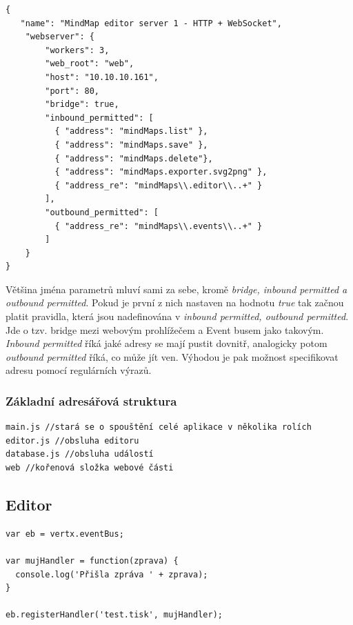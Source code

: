 \begin{lstlisting}[caption=Konfigurace serveru 1]
{
   "name": "MindMap editor server 1 - HTTP + WebSocket",
    "webserver": {
        "workers": 3,
        "web_root": "web",
        "host": "10.10.10.161",
        "port": 80,
        "bridge": true,
        "inbound_permitted": [
          { "address": "mindMaps.list" },
          { "address": "mindMaps.save" },
          { "address": "mindMaps.delete"},
          { "address": "mindMaps.exporter.svg2png" },
          { "address_re": "mindMaps\\.editor\\..+" }
        ],
        "outbound_permitted": [
          { "address_re": "mindMaps\\.events\\..+" }
        ]
    }
}
\end{lstlisting}

Většina jména parametrů mluví sami za sebe, kromě \emph{bridge, inbound permitted a outbound permitted}. Pokud je první z nich nastaven na hodnotu \emph{true} tak začnou platit pravidla, která jsou nadefinována v \emph{inbound permitted, outbound permitted}. Jde o tzv. bridge mezi webovým prohlížečem a Event busem jako takovým. \emph{Inbound permitted} říká jaké adresy se mají pustit dovnitř, analogicky potom \emph{outbound permitted} říká, co může jít ven. Výhodou je pak možnost specifikovat adresu pomocí regulárních výrazů.

\subsubsection{Základní adresářová struktura}

\begin{lstlisting}
main.js //stará se o spouštění celé aplikace v několika rolích
editor.js //obsluha editoru
database.js //obsluha událostí 
web //kořenová složka webové části
\end{lstlisting}

\subsection{Editor}

\begin{lstlisting}[caption=Zaregistrování obslužné rutiny v jazyce JavaScript]
var eb = vertx.eventBus;

var mujHandler = function(zprava) {
  console.log('Přišla zpráva ' + zprava);
}

eb.registerHandler('test.tisk', mujHandler);
\end{lstlisting}


